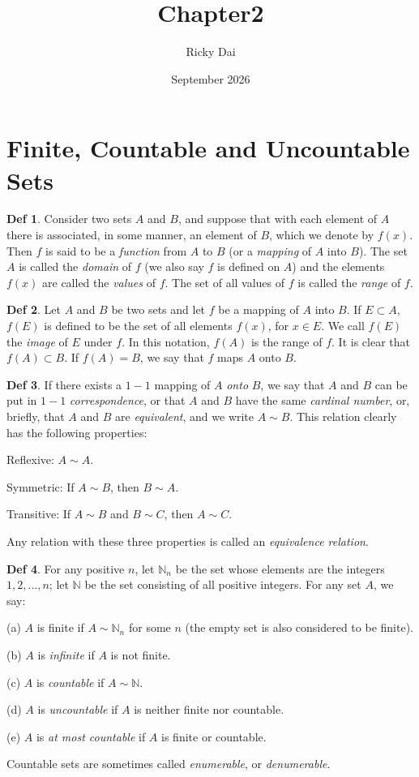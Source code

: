 \documentclass{article}
\title{Chapter2}
\author{Ricky Dai}
\date{September 2026}
\theoremstyle{definition}
\newtheorem{definition}{Def}
\begin{document}
\maketitle

\section{Finite, Countable and Uncountable Sets}
\begin{definition}
    Consider two sets $A$ and $B$, and suppose that with each element of $A$ there is associated, in some manner, an element of $B$, which we denote by $f(x)$. Then $f$ is said to be a \textit{function} from $A$ to $B$ (or a \textit{mapping} of $A$ into $B$). The set $A$ is called the \textit{domain} of $f$ (we also say $f$ is defined on $A$) and the elements $f(x)$ are called the \textit{values} of $f$. The set of all values of $f$ is called the \textit{range} of $f$.
\end{definition}
\begin{definition}
    Let $A$ and $B$ be two sets and let $f$ be a mapping of $A$ into $B$. If $E\subset A$, $f(E)$ is defined to be the set of all elements $f(x)$, for $x\in E$. We call $f(E)$ the \textit{image} of $E$ under $f$. In this notation, $f(A)$ is the range of $f$. It is clear that $f(A)\subset B$. If $f(A)=B$, we say that $f$ maps $A$ onto $B$.
\end{definition}
\begin{definition}
    If there exists a $1-1$ mapping of $A$ \textit{onto} $B$, we say that $A$ and $B$ can be put in $1-1$ \textit{correspondence}, or that $A$ and $B$ have the same \textit{cardinal number}, or, briefly, that $A$ and $B$ are \textit{equivalent}, and we write $A\sim B$. This relation clearly has the following properties:\par
    Reflexive: $A\sim A$.\par
    Symmetric: If $A\sim B$, then $B\sim A$.\par
    Transitive: If $A\sim B$ and $B\sim C$, then $A\sim C$.\par
    Any relation with these three properties is called an \textit{equivalence relation}.
\end{definition}
\begin{definition}
    For any positive $n$, let $\mathbb{N}_n$ be the set whose elements are the integers $1, 2, ..., n$; let $\mathbb{N}$ be the set consisting of all positive integers. For any set $A$, we say:\par
    (a) $A$ is finite if $A\sim \mathbb{N}_n$ for some $n$ (the empty set is also considered to be finite).\par
    (b) $A$ is \textit{infinite} if $A$ is not finite.\par
    (c) $A$ is \textit{countable} if $A\sim \mathbb{N}$.\par
    (d) $A$ is \textit{uncountable} if $A$ is neither finite nor countable.\par
    (e) $A$ is \textit{at most countable} if $A$ is finite or countable.\par
    Countable sets are sometimes called \textit{enumerable}, or \textit{denumerable}.
\end{definition}
\end{document}
